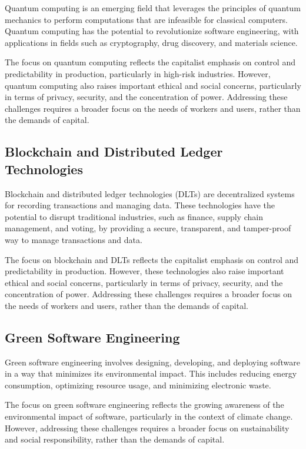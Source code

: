 \begin{refsection}
\begin{multicols}{2}
{Quantum computing is an emerging field that leverages the principles of quantum mechanics to perform computations that are infeasible for classical computers. Quantum computing has the potential to revolutionize software engineering, with applications in fields such as cryptography, drug discovery, and materials science.

The focus on quantum computing reflects the capitalist emphasis on control and predictability in production, particularly in high-risk industries. However, quantum computing also raises important ethical and social concerns, particularly in terms of privacy, security, and the concentration of power. Addressing these challenges requires a broader focus on the needs of workers and users, rather than the demands of capital.

\subsection{Blockchain and Distributed Ledger Technologies}

Blockchain and distributed ledger technologies (DLTs) are decentralized systems for recording transactions and managing data. These technologies have the potential to disrupt traditional industries, such as finance, supply chain management, and voting, by providing a secure, transparent, and tamper-proof way to manage transactions and data.

The focus on blockchain and DLTs reflects the capitalist emphasis on control and predictability in production. However, these technologies also raise important ethical and social concerns, particularly in terms of privacy, security, and the concentration of power. Addressing these challenges requires a broader focus on the needs of workers and users, rather than the demands of capital.

\subsection{Green Software Engineering}

Green software engineering involves designing, developing, and deploying software in a way that minimizes its environmental impact. This includes reducing energy consumption, optimizing resource usage, and minimizing electronic waste.

The focus on green software engineering reflects the growing awareness of the environmental impact of software, particularly in the context of climate change. However, addressing these challenges requires a broader focus on sustainability and social responsibility, rather than the demands of capital.

}
\end{multicols}
\end{refsection}
